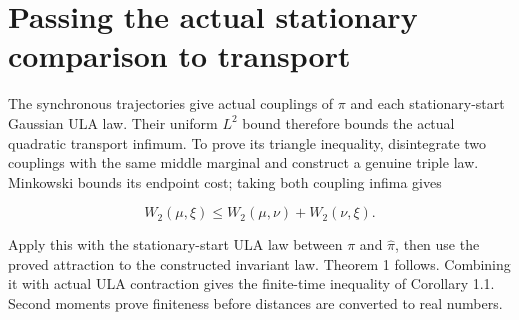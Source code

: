 \documentclass[11pt,a4paper]{report}
\begin{document}
\section{\texorpdfstring{Passing the actual stationary comparison to transport}{Passing the actual stationary comparison to transport}}


The synchronous trajectories give actual couplings of
    \(\pi\) and each stationary-start Gaussian ULA law. Their uniform
    \(L^2\) bound therefore bounds the actual quadratic transport
    infimum. To prove its triangle inequality, disintegrate two couplings
    with the same middle marginal and construct a genuine triple law.
    Minkowski bounds its endpoint cost; taking both coupling infima gives


    \[W_2(\mu,\xi)\le W_2(\mu,\nu)+W_2(\nu,\xi).\]


Apply this with the stationary-start ULA law between \(\pi\) and
    \(\widehat\pi\), then use the proved attraction to the constructed
    invariant law. Theorem 1 follows. Combining it with actual ULA
    contraction gives the finite-time inequality of Corollary 1.1.
    Second moments prove finiteness before distances are converted to
    real numbers.
\end{document}
